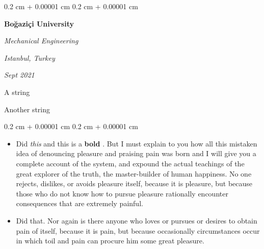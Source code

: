 \documentclass[10pt, letterpaper]{article}
\newenvironment{summary}{
    \begin{description}[
        topsep=0.10 cm,
        parsep=0.10 cm,
        partopsep=0pt,
        itemsep=0pt,
        leftmargin=0.4 cm + 10pt
    ]
}{
    \end{description}
} %
\newenvironment{highlights}{
    \begin{itemize}[
        topsep=0.10 cm,
        parsep=0.10 cm,
        partopsep=0pt,
        itemsep=0pt,
        leftmargin=0.4 cm + 10pt
    ]
}{
    \end{itemize}
} %
\newenvironment{onecolentry}{
    \begin{adjustwidth}{
        0.2 cm + 0.00001 cm
    }{
        0.2 cm + 0.00001 cm
    }
}{
    \end{adjustwidth}
} %
\newenvironment{twocolentry}[2][]{
    \onecolentry
    \def\secondColumn{#2}
    \setcolumnwidth{\fill, 4.5 cm}
    \begin{paracol}{2}
}{
    \switchcolumn \raggedleft \secondColumn
    \end{paracol}
    \endonecolentry
} %
\let\hrefWithoutArrow\href
\renewcommand{\href}[2]{\hrefWithoutArrow{#1}{\ifthenelse{\equal{#2}{}}{ }{#2 }\raisebox{.15ex}{\footnotesize \faExternalLink*}}}
\begin{document}
        \begin{twocolentry}{
        \textit{Istanbul, Turkey}    
            
        \textit{Sept 2021}}
            \textbf{Boğaziçi University}

            \textit{Mechanical Engineering}
        \end{twocolentry}
            \begin{summary}
                \item A string
                \item Another string
            \end{summary}
        \vspace{0.10 cm}
        \begin{onecolentry}
            \begin{highlights}
                \item Did \textit{this} and this is a \textbf{bold} \href{https://example.com}{link}. But I must explain to you how all this mistaken idea of denouncing pleasure and praising pain was born and I will give you a complete account of the system, and expound the actual teachings of the great explorer of the truth, the master-builder of human happiness. No one rejects, dislikes, or avoids pleasure itself, because it is pleasure, but because those who do not know how to pursue pleasure rationally encounter consequences that are extremely painful.
                \item Did that. Nor again is there anyone who loves or pursues or desires to obtain pain of itself, because it is pain, but because occasionally circumstances occur in which toil and pain can procure him some great pleasure.
            \end{highlights}
        \end{onecolentry}


        \vspace{0.2 cm}
\end{document}
